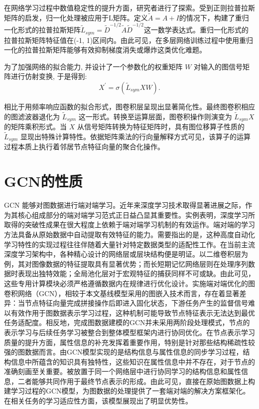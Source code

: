 在网络学习过程中数值稳定性的提升方面，研究者\textcite{2016_Kipf_Semi_supervised_classification_with_graph_convolutionalnetworks}进行了探索。受到正则拉普拉斯矩阵的启发，归一化处理被应用于L矩阵。定义\(\widetilde{A} = A + I\)的情况下，构建了重归一化形式的拉普拉斯矩阵\({\widetilde{L}}_{sym} = {\widetilde{D}}^{-1/2}\widetilde{A}{\widetilde{D}}^{-1/2}\)这一数学表达式。重归一化形式的拉普拉斯矩阵特征值在(-1, 1)区间内。由此可见，在多层网络训练过程中使用重归一化的拉普拉斯矩阵能够有效抑制梯度消失或爆炸这类优化难题。

为了加强网络的拟合能力, 并设计了一个参数化的权重矩阵 \({W}\) 对输入的图信号矩阵进行仿射变换, 于是得到:
\begin{equation}
{X}^{\prime } = \sigma \left( {{\widetilde{L}}_{sym}{XW}}\right).
\end{equation}

相比于用频率响应函数的拟合形式，图卷积层呈现出显著简化性。最终图卷积相应的图滤波器退化为 \({\widetilde{L}}_{sym}\) 这一形式。转换至运算层面，图卷积操作则演变为 \({\widetilde{L}}_{sym}{X}\) 的矩阵乘积形式。当 \({X}\) 从信号矩阵转换为特征矩阵时，具有图位移算子性质的 \({\widetilde{L}}_{sym}\) 显现出特殊计算特性。依据矩阵乘法的行向量解释方式可见，该算子的运算过程本质上执行着邻居节点特征向量的聚合化操作。


\section{GCN的性质}
GCN 能够对图数据进行端对端学习。近年来深度学习技术取得显著进展之际，作为其核心组成部分的端对端学习范式正日益凸显其重要性。实例表明，深度学习所取得的突破性成果在很大程度上依赖于端对端学习机制的有效运作。端对端的学习方法具备从原始数据中自动提取有效特征的能力。需要指出的是，这种高度自动化学习特性的实现过程往往伴随着大量针对特定数据类型的适配性工作。在当前主流深度学习架构中，各种精心设计的网络层或层块结构便是明证。以二维卷积层为例，其对图像数据的特征提取具有显著优势；而长短期记忆网络层则在处理序列数据时表现出独特效能；全局池化层对于宏观特征的捕获同样不可或缺。由此可见，这些专用计算模块必须严格遵循数据内在规律进行优化设计。实施端对端优化的图卷积网络（GCN），相较于本文基线模型采用的图嵌入技术而言，存在着显著差异：当节点特征向量完成拼接操作后即进入固化状态，下游任务产生的监督信号难以有效作用于图数据表示学习过程，这种机制可能导致节点特征表示无法达到最优任务适配度。相反地，完成图数据建模的GCN并未采用两阶段处理模式，节点的表示学习与后续任务学习被整合到整体模型框架内进行协同优化。在节点表示学习质量的提升方面，属性信息的补充发挥着重要作用，特别是针对那些结构稀疏性较强的图数据而言。由GCN模型实现的是结构信息与属性信息的同步学习过程，结构信息中所蕴含的知识具有独特性，这些知识在属性信息中并不存在，对于节点的准确刻画至关重要。被放置于同一个网络层中进行协同学习的结构信息和属性信息，二者能够共同作用于最终节点表示的形成。由此可见，直接在原始图数据上构建学习过程的GCN模型，为图数据的处理提供了一套端对端的解决方案框架化。在相关任务的学习适应性方面，该模型展现出了明显优势性。

